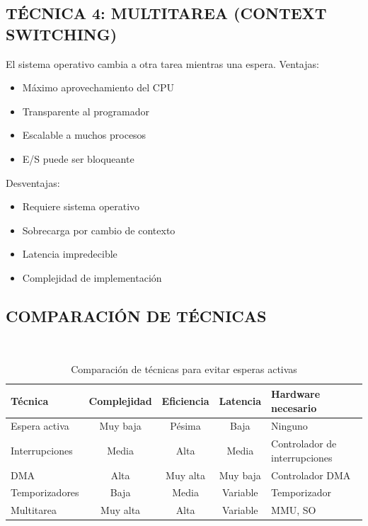 \documentclass{article}
\begin{document}
\subsection{TÉCNICA 4: MULTITAREA (CONTEXT SWITCHING)}
El sistema operativo cambia a otra tarea mientras una espera.
Ventajas:
\begin{itemize}
    \item Máximo aprovechamiento del CPU
    \item Transparente al programador
    \item  Escalable a muchos procesos
    \item E/S puede ser bloqueante
\end{itemize}
Desventajas: 
\begin{itemize}
    \item Requiere sistema operativo
    \item Sobrecarga por cambio de contexto
    \item Latencia impredecible
    \item Complejidad de implementación
\end{itemize}
\subsection{COMPARACIÓN DE TÉCNICAS}
\\
\begin{table}[H]
\centering
\begin{tabular}{l c c c p{4cm}}
\toprule
\textbf{Técnica} & \textbf{Complejidad} & \textbf{Eficiencia} & \textbf{Latencia} & \textbf{Hardware necesario} \\
\midrule
Espera activa & Muy baja & Pésima & Baja & Ninguno \\
\midrule
Interrupciones & Media & Alta & Media & Controlador de interrupciones \\
\midrule
DMA & Alta & Muy alta & Muy baja & Controlador DMA \\
\midrule
Temporizadores & Baja & Media & Variable & Temporizador \\
\midrule
Multitarea & Muy alta & Alta & Variable & MMU, SO \\
\bottomrule
\end{tabular}
\caption{Comparación de técnicas para evitar esperas activas}
\label{tab:tecnicas_io}
\end{table}
\\
\end{document}
